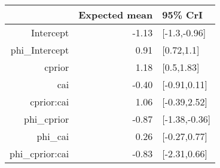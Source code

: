 \begin{tabular}{rrl}
  \hline
 & Expected mean & 95\% CrI \\ 
  \hline
Intercept & -1.13 & [-1.3,-0.96] \\ 
  phi\_Intercept & 0.91 & [0.72,1.1] \\ 
  cprior & 1.18 & [0.5,1.83] \\ 
  cai & -0.40 & [-0.91,0.11] \\ 
  cprior:cai & 1.06 & [-0.39,2.52] \\ 
  phi\_cprior & -0.87 & [-1.38,-0.36] \\ 
  phi\_cai & 0.26 & [-0.27,0.77] \\ 
  phi\_cprior:cai & -0.83 & [-2.31,0.66] \\ 
   \hline
\end{tabular}

